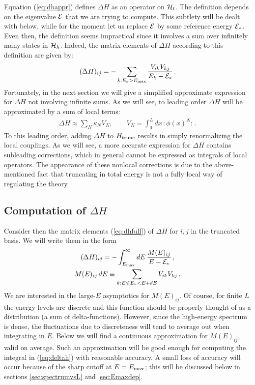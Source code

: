 \documentclass[11pt]{article}
\newcommand{\reef}[1]{(\ref{#1})}
\def\calH {{\cal H}}
\def\calE {{\cal E}}
\def\le{\leqslant}
\newcommand{\NO}[1]{{:\!#1\!:}}
\def \Emax{E_{\rm max}}
\def \Er{{\calE_{\rm *}}}
\numberwithin{equation}{section}
\begin{document}
Equation \reef{eq:dhappr} defines $\Delta H$ as an operator on $\calH_l$. The definition depends on the eigenvalue $\calE$ that we are trying to compute. This subtlety will be dealt with below, while for the moment let us replace $\calE$ by some reference energy $\Er$. Even then, the definition seems impractical since it involves a sum over infinitely many states in $\calH_h$. Indeed, the matrix elements of $\Delta H$ according to this definition are given by:
\begin{equation}
\label{eq:dhfull}
(\Delta H)_{ij} =- \sum_{k:E_k>\Emax} \frac{ V_{ik} V_{kj}}{E_k-\Er}\,.
\end{equation}
Fortunately, in the next section we will give a simplified approximate expression for $\Delta H$ not involving infinite sums.
As we will see, to leading order $\Delta H$ will be approximated by a sum of local terms:
%
\begin{gather}
\label{eq:Vn}
\Delta H \approx \sum_N \kappa_N V_N , \qquad V_N= \int_0^L d x\, \NO{\phi(x)^N}\,.
\end{gather}
%
To this leading order, adding $\Delta H$ to $H_{\rm trunc}$ results in simply renormalizing the local couplings. As we will see, a more accurate expression for $\Delta H$ contains subleading corrections, which in general cannot be expressed as integrals of local operators. The appearance of these nonlocal corrections is due to the above-mentioned fact that truncating in total energy is not a fully local way of regulating the theory. 

\subsection{Computation of $\Delta H$}
\label{sec:deltah_comp}

Consider then the matrix elements \reef{eq:dhfull} of $\Delta H$ for $i,j$ in the truncated basis. We will write them in the form
%
\begin{gather}
\label{eq:deltah}
(\Delta H)_{ij} =- \int_{E_{\max}}^{\infty} d E\, \frac{ M(E)_{ij}}{E-\Er}\, ,\\
\label{eq:deltah1}
M(E)_{ij}\,dE \equiv \sum_{k:E \le E_k < E+ dE} V_{ik}V_{kj}\,.
\end{gather}
%
We are interested in the large-$E$ asymptotics for $M(E)_{ij}$. Of course, for finite $L$ the energy levels are discrete and this function should be properly thought of as a distribution (a sum of delta-functions). However, since the high-energy spectrum is dense, the fluctuations due to discreteness will tend to average out when integrating in $E$.
Below we will find a continuous approximation for $M(E)_{ij}$, valid on average. Such an approximation will be good enough for computing the integral in \reef{eq:deltah} with reasonable accuracy. A small loss of accuracy will occur because of the sharp cutoff at $E=\Emax$; this will be discussed below in sections \ref{sec:spectrumvsL} and \ref{sec:Emaxdep}.
\end{document}
